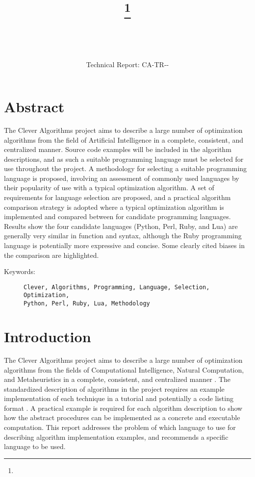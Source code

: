 \documentclass[a4paper, 11pt]{article}
\title{{\myreporttitle}\footnote{\myreportlicense}}
\author{\myreportauthor\\{\myreportemail}\\\small\myreportproject}
\date{\myreportfulldate\\{\small{Technical Report: CA-TR-{\myreportdate}-\myreportversion}}}
\begin{document}
\maketitle

\section*{Abstract} 
The Clever Algorithms project aims to describe a large number of optimization algorithms from the field of Artificial Intelligence in a complete, consistent, and centralized manner.
Source code examples will be included in the algorithm descriptions, and as such a suitable programming language must be selected for use throughout the project.
A methodology for selecting a suitable programming language is proposed, involving an assessment of commonly used languages by their popularity of use with a typical optimization algorithm. A set of requirements for language selection are proposed, and a practical algorithm comparison strategy is adopted where a typical optimization algorithm is implemented and compared between for candidate programming languages. 
Results show the four candidate languages (Python, Perl, Ruby, and Lua) are generally very similar in function and syntax, although the Ruby programming language is potentially more expressive and concise. Some clearly cited biases in the comparison are highlighted.

\begin{description}
	\item[Keywords:] {\small\texttt{Clever, Algorithms, Programming, Language, Selection, Optimization, \\
	Python, Perl, Ruby, Lua, Methodology}}
\end{description} 

\section{Introduction}
\label{sec:introduction}
The Clever Algorithms project aims to describe a large number of optimization algorithms from the fields of Computational Intelligence, Natural Computation, and Metaheuristics in a complete, consistent, and centralized manner \cite{Brownlee2010}.
The standardized description of algorithms in the project requires an example implementation of each technique in a tutorial and potentially a code listing format \cite{Brownlee2010a}.
A practical example is required for each algorithm description to show how the abstract procedures can be implemented as a concrete and executable computation.
This report addresses the problem of which language to use for describing algorithm implementation examples, and recommends a specific language to be used.
\end{document}
